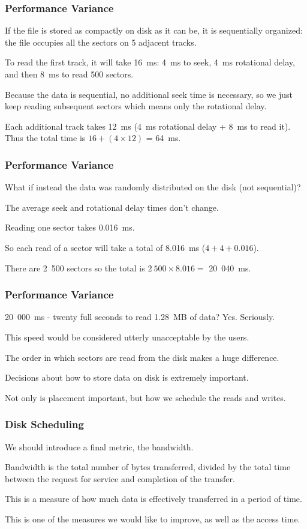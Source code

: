 \begin{frame}
\frametitle{Performance Variance}

If the file is stored as compactly on disk as it can be, it is \alert{sequentially organized}: the file occupies all the sectors on 5 adjacent tracks. 

To read the first track, it will take 16~ms: 4~ms to seek, 4~ms rotational delay, and then 8~ms to read 500 sectors. 

Because the data is sequential, no additional seek time is necessary, so we just keep reading subsequent sectors which means only the rotational delay. 

Each additional track takes 12~ms (4~ms rotational delay + 8~ms to read it). Thus the total time is $16 + (4 \times 12)$ = 64~ms.

\end{frame}

\begin{frame}
\frametitle{Performance Variance}

What if instead the data was randomly distributed on the disk (not sequential)? 

The average seek and rotational delay times don't change. 

Reading one sector takes 0.016~ms. 

So each read of a sector will take a total of 8.016~ms ($4 + 4 + 0.016$).

There are 2~500 sectors so the total is $2~500 \times 8.016 =$ 20~040~ms. 

\end{frame}

\begin{frame}
\frametitle{Performance Variance}

20~000~ms - twenty full seconds to read 1.28~MB of data? Yes. Seriously. 

This speed would be considered utterly unacceptable by the users. 

The order in which sectors are read from the disk makes a huge difference. 

Decisions about how to store data on disk is extremely important. 

Not only is placement important, but how we schedule the reads and writes.


\end{frame}

\begin{frame}
\frametitle{Disk Scheduling}

We should introduce a final metric, the \alert{bandwidth}. 

Bandwidth is the total number of bytes transferred, divided by the total time between the request for service and completion of the transfer. 

This is a measure of how much data is effectively transferred in a period of time. 

This is one of the measures we would like to improve, as well as the access time.

\end{frame}

